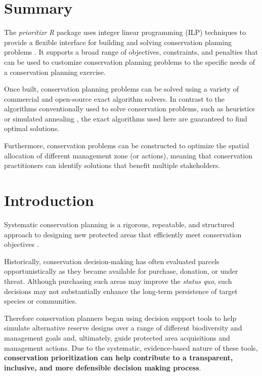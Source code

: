 \documentclass[
  12pt,
]{book}
\begin{document}
\hypertarget{summary}{%
\section{Summary}\label{summary}}

The \emph{prioritizr R} package uses integer linear programming (ILP) techniques to provide a flexible interface for building and solving conservation planning problems \citep{r11, r16}. It supports a broad range of objectives, constraints, and penalties that can be used to customize conservation planning problems to the specific needs of a conservation planning exercise.

Once built, conservation planning problems can be solved using a variety of commercial and open-source exact algorithm solvers. In contrast to the algorithms conventionally used to solve conservation problems, such as heuristics or simulated annealing \citep{r3}, the exact algorithms used here are guaranteed to find optimal solutions.

Furthermore, conservation problems can be constructed to optimize the spatial allocation of different management zone (or actions), meaning that conservation practitioners can identify solutions that benefit multiple stakeholders.

\hypertarget{introduction}{%
\section{Introduction}\label{introduction}}

Systematic conservation planning is a rigorous, repeatable, and structured approach to designing new protected areas that efficiently meet conservation objectives \citep{r4}.

Historically, conservation decision-making has often evaluated parcels opportunistically as they became available for purchase, donation, or under threat. Although purchasing such areas may improve the \emph{status quo}, such decisions may not substantially enhance the long-term persistence of target species or communities.

Therefore conservation planners began using decision support tools to help simulate alternative reserve designs over a range of different biodiversity and management goals and, ultimately, guide protected area acquisitions and management actions. Due to the systematic, evidence-based nature of these tools, \textbf{conservation prioritization can help contribute to a transparent, inclusive, and more defensible decision making process}.
\end{document}
